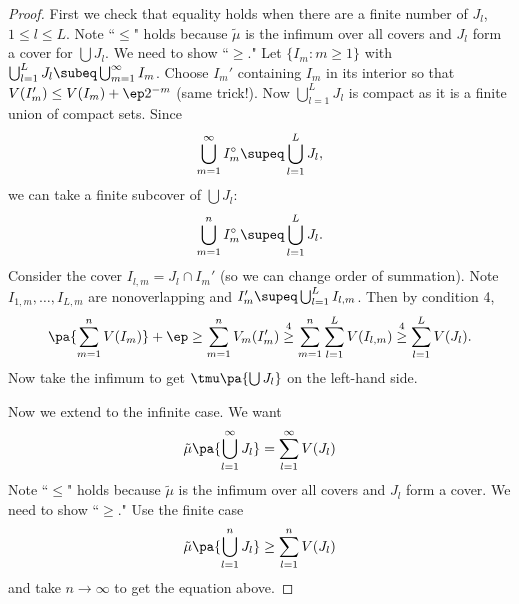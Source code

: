 \begin{proof}
First we check that equality holds when there are a finite number of $J_l$, $1\leq l\leq L$.
Note ``$\leq$" holds because $\tilde{\mu}$ is the infimum over all covers and $J_l$ form a cover for $\bigcup J_l$. We need to show ``$\geq$."
Let $\{I_m:m\geq 1\}$ with $\bigcup_{l=1}^L J_l\subeq \bigcup_{m=1}^{\infty} I_m$. Choose $I_m'$ containing $I_m$ in its interior so that $V(I_m')\leq V(I_m)+\ep 2^{-m}$ (same trick!). 
Now $\bigcup_{l=1}^L J_l$ is compact as it is a finite union of compact sets. Since
\[\bigcup_{m=1}^{\infty} I_m^{\circ}\supeq \bigcup_{l=1}^L J_l,\]
we can take a finite subcover of $\bigcup J_l$:
\[
\bigcup_{m=1}^n I_m^{\circ}\supeq \bigcup_{l=1}^L J_l.
\]
Consider the cover $I_{l,m} =J_l\cap I_m'$ (so we can change order of summation). Note $I_{1,m},\ldots, I_{L,m}$ are nonoverlapping and $I_m'\supeq \bigcup_{l=1}^L I_{l,m}$. Then by condition 4,
\[\pa{\sum_{m=1}^n V(I_m)}+\ep\geq \sum_{m=1}^n V_m(I_m')
\stackrel{4}{\geq} \sum_{m=1}^n\sum_{l=1}^L V(I_{l,m})
\stackrel{4}{\geq} \sum_{l=1}^L V(J_l). 
\]
Now take the infimum to get $\tmu\pa{\bigcup J_l}$ on the left-hand side.

Now we extend to the infinite case. %
We want 
\[
\tilde{\mu}\pa{\bigcup_{l=1}^{\infty}  J_l}=\sum_{l=1}^{\infty} V(J_l)
\]
Note ``$\leq$" holds because $\tilde{\mu}$ is the infimum over all covers and $J_l$ form a cover. We need to show ``$\geq$."
Use the finite case
\[
\tilde{\mu}\pa{\bigcup_{l=1}^n  J_l}\geq \sum_{l=1}^{n}V(J_l)
\]
and take $n\to \infty$ to get the equation above.
\end{proof}
